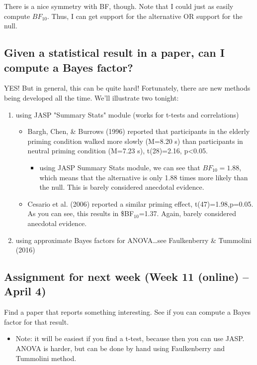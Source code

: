 \documentclass[article,10pt]{article}
\begin{document}
There is a nice symmetry with BF, though.  Note that I could just as easily compute $BF_{10}$.  Thus, I can get support for the alternative OR support for the null.

\subsection*{Given a statistical result in a paper, can I compute a Bayes factor?}
\label{sec-2-3}

YES!  But in general, this can be quite hard!  Fortunately, there are new methods being developed all the time.  We'll illustrate two tonight:

\begin{enumerate}
\item using JASP "Summary Stats" module (works for t-tests and correlations)
\begin{itemize}
\item Bargh, Chen, \& Burrows (1996) reported that participants in the elderly priming condition walked more slowly (M=8.20 s) than participants in neutral priming condition (M=7.23 s), t(28)=2.16, p<0.05.
\begin{itemize}
\item using JASP Summary Stats module, we can see that $BF_{10}=1.88$, which means that the alternative is only 1.88 times more likely than the null.  This is barely considered anecdotal evidence.
\end{itemize}
\item Cesario et al. (2006) reported a similar priming effect, t(47)=1.98,p=0.05.  As you can see, this results in \$BF$_{\text{10}}$=1.37.  Again, barely considered anecdotal evidence.
\end{itemize}

\item using approximate Bayes factors for ANOVA\ldots{}see Faulkenberry \& Tummolini (2016)
\end{enumerate}

\subsection*{Assignment for next week (Week 11 (online) -- April 4)}
\label{sec-2-4}
Find a paper that reports something interesting.  See if you can compute a Bayes factor for that result.
\begin{itemize}
\item Note: it will be easiest if you find a t-test, because then you can use JASP.  ANOVA is harder, but can be done by hand using Faulkenberry and Tummolini method.
\end{itemize}
\end{document}
